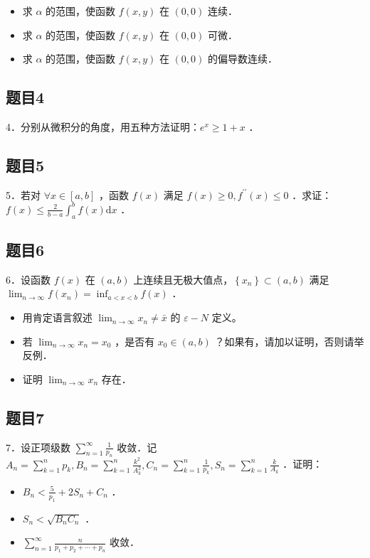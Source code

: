 \documentclass{article}
\begin{document}
\begin{itemize}
  \item[（1）] 求 \(\alpha\) 的范围，使函数 \(f(x, y)\) 在 \((0,0)\) 连续．
  \item[（2）] 求 \(\alpha\) 的范围，使函数 \(f(x, y)\) 在 \((0,0)\) 可微．
  \item[（3）] 求 \(\alpha\) 的范围，使函数 \(f(x, y)\) 在 \((0,0)\) 的偏导数连续．
\end{itemize}

\subsection{题目4}
4．分别从微积分的角度，用五种方法证明：\(e^{x} \geq 1+x\) ．

\subsection{题目5}
5．若对 \(\forall x \in[a, b]\) ，函数 \(f(x)\) 满足 \(f(x) \geq 0, f^{\prime \prime}(x) \leq 0\) ．求证：\(f(x) \leq \frac{2}{b-a} \int_{a}^{b} f(x) \mathrm{d} x\) ．

\subsection{题目6}
6．设函数 \(f(x)\) 在 \((a, b)\) 上连续且无极大值点，\(\left\{x_{n}\right\} \subset(a, b)\) 满足 \(\lim _{n \rightarrow \infty} f\left(x_{n}\right)=\inf _{a<x<b} f(x)\) ．

\begin{itemize}
  \item[（1）] 用肯定语言叙述 \(\lim _{n \rightarrow \infty} x_{n} \neq \bar{x}\) 的 \(\varepsilon-N\) 定义。
  \item[（2）] 若 \(\lim _{n \rightarrow \infty} x_{n}=x_{0}\) ，是否有 \(x_{0} \in(a, b)\) ？如果有，请加以证明，否则请举反例．
  \item[（3）] 证明 \(\lim _{n \rightarrow \infty} x_{n}\) 存在．
\end{itemize}

\subsection{题目7}
7．设正项级数 \(\sum_{n=1}^{\infty} \frac{1}{p_{n}}\) 收敛．记 \(A_{n}=\sum_{k=1}^{n} p_{k}, B_{n}=\sum_{k=1}^{n} \frac{k^{2}}{A_{k}^{2}}, C_{n}=\sum_{k=1}^{n} \frac{1}{p_{k}}, S_{n}=\sum_{k=1}^{n} \frac{k}{A_{k}}\) ．证明：

\begin{itemize}
  \item[（1）] \(B_{n}<\frac{5}{p_{1}}+2 S_{n}+C_{n}\) ．
  \item[（2）] \(S_{n}<\sqrt{B_{n} C_{n}}\) ．
  \item[（3）] \(\sum_{n=1}^{\infty} \frac{n}{p_{1}+p_{2}+\cdots+p_{n}}\) 收敛．
\end{itemize}
\end{document}
